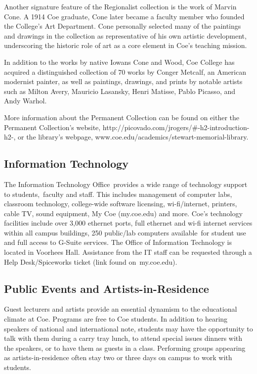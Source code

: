 \documentclass[
  letterpaper,
]{scrbook}
\begin{document}
Another signature feature of the Regionalist collection is the work of
Marvin Cone. A 1914 Coe graduate, Cone later became a faculty member who
founded the College's Art Department. Cone personally selected many of
the paintings and drawings in the collection as representative of his
own artistic development, underscoring the historic role of art as a
core element in Coe's teaching mission.

In addition to the works by native Iowans Cone and Wood, Coe College has
acquired a distinguished collection of 70 works by Conger Metcalf, an
American modernist painter, as well as paintings, drawings, and prints
by notable artists such as Milton Avery, Mauricio Lasansky, Henri
Matisse, Pablo Picasso, and Andy Warhol.

More information about the Permanent Collection can be found on either
the Permanent Collection's website,
http://picovado.com/jrogers/\#-h2-introduction-h2-, or the library's
webpage, www.coe.edu/academics/stewart-memorial-library.

\subsection{Information Technology}\label{information-technology}

The Information Technology Office~provides a wide range of technology
support to students,~faculty and staff. This includes management of
computer labs, classroom technology, college-wide software licensing,
wi-fi/internet, printers, cable TV, sound equipment, My Coe (my.coe.edu)
and more. Coe's technology facilities include over 3,000 ethernet ports,
full ethernet and wi-fi internet services within all campus buildings,
250 public/lab computers available~for student use and full access to
G-Suite services. The Office of Information Technology is located in
Voorhees Hall. Assistance from the IT staff can be requested through a
Help Desk/Spiceworks ticket (link found on~my.coe.edu).~

\subsection{Public Events and
Artists-in-Residence}\label{public-events-and-artists-in-residence}

Guest lecturers and artists provide an essential dynamism to the
educational climate at Coe. Programs are free to Coe students. In
addition to hearing speakers of national and international note,
students may have the opportunity to talk with them during a carry tray
lunch, to attend special issues dinners with the speakers, or to have
them as guests in a class. Performing groups appearing as
artists-in-residence often stay two or three days on campus to work with
students.
\end{document}
